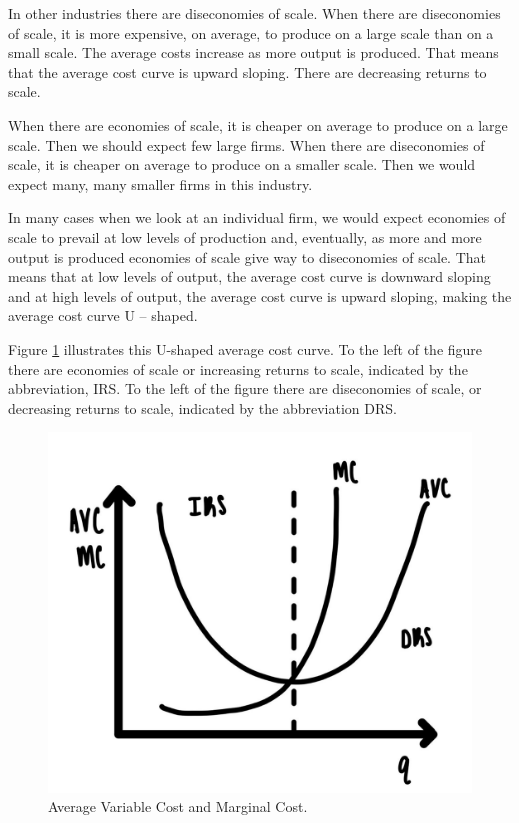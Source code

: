 \documentclass[
]{book}
\begin{document}
In other industries there are diseconomies of scale. When there are diseconomies of scale, it is more expensive, on average, to produce on a large scale than on a small scale. The average costs increase as more output is produced. That means that the average cost curve is upward sloping. There are decreasing returns to scale.

When there are economies of scale, it is cheaper on average to produce on a large scale. Then we should expect few large firms. When there are diseconomies of scale, it is cheaper on average to produce on a smaller scale. Then we would expect many, many smaller firms in this industry.

In many cases when we look at an individual firm, we would expect economies of scale to prevail at low levels of production and, eventually, as more and more output is produced economies of scale give way to diseconomies of scale. That means that at low levels of output, the average cost curve is downward sloping and at high levels of output, the average cost curve is upward sloping, making the average cost curve U -- shaped.

Figure \ref{fig:fig402} illustrates this U-shaped average cost curve. To the left of the figure there are economies of scale or increasing returns to scale, indicated by the abbreviation, IRS. To the left of the figure there are diseconomies of scale, or decreasing returns to scale, indicated by the abbreviation DRS.

\begin{figure}

{\centering \includegraphics[width=0.75\linewidth]{img/ch4/fig2} 

}

\caption{Average Variable Cost and Marginal Cost.}\label{fig:fig402}
\end{figure}
\end{document}
